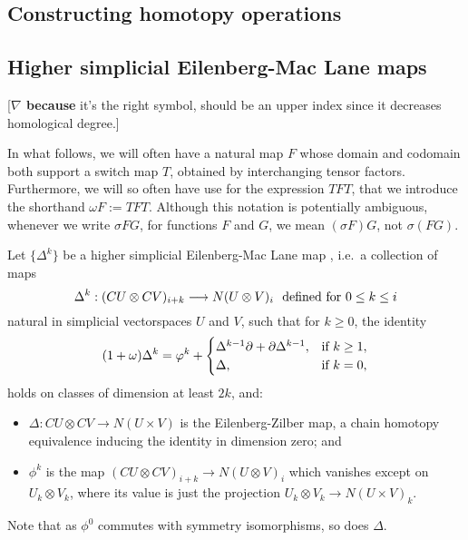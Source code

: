 \documentclass[11pt]{amsart}
\theoremstyle{plain}
\theoremstyle{definition}
\let\oldphi\phi
\let\phi\varphi
\renewcommand{\to}{\longrightarrow}
\theoremstyle{plain}
\newcommand{\twist}{\omega}
\newcommand{\DeltaUp}{\Delta}%
\newcommand{\Nabla}{\nabla}
\begin{document}
\begin{Constructing (co)homotopy operations}
\vfil\pagebreak


\section{\textbf{Constructing homotopy operations}}\label{sec:Constructing homotopy operations}

\subsection{Higher simplicial Eilenberg-Mac Lane maps}[\textbf{$\Nabla$ because} it's the right symbol, should be an upper index since it decreases homological degree.]


In what follows, we will often have a natural map $F$ whose domain and codomain both support a switch map $T$, obtained by interchanging tensor factors. Furthermore, we will so often have use for the expression $TFT$, that we introduce the shorthand $\twist F:=TFT$. %
Although this notation is potentially ambiguous, whenever we write $\sigma FG$, for functions $F$ and $G$, we mean $(\sigma F)G$, not $\sigma(FG)$.

Let $\{\DeltaUp^k\}$ be a higher simplicial Eilenberg-Mac Lane map \cite[\S3]{DwyerHtpyOpsSimpComAlg.pdf}, i.e.\ a collection of maps
\[\DeltaUp^k:(CU\otimes CV)_{i+k}\to N(U\otimes V)_i\textup{\ \ defined for $0\leq k\leq i$}\]
natural in simplicial vectorspaces $U$ and $V$, such that for $k\geq0$, the identity
\[(1+\twist) \DeltaUp^k=\oldphi^k+\begin{cases}
\DeltaUp^{k-1}\partial+\partial\DeltaUp^{k-1},&\textup{if }k\geq1,\\
\DeltaUp,&\textup{if }k=0,
\end{cases}
\]
holds on classes of dimension at least $2k$, and:
\begin{itemize}
\setlength{\parindent}{.25in}
\item $\DeltaUp:CU\otimes CV\to N(U\times V)$ is the Eilenberg-Zilber map, a chain homotopy equivalence inducing the identity in dimension zero; and
\item $\oldphi^k$ is the map $(CU\otimes CV)_{i+k}\to N(U\otimes V)_i$ which vanishes except on $U_k\otimes V_k$, where its value is just the projection $U_k\otimes V_k\to N(U\times V)_k$.
\end{itemize}
Note that as $\oldphi^0$ commutes with symmetry isomorphisms, so does $\DeltaUp$.






\end{Constructing (co)homotopy operations}
\end{document}
